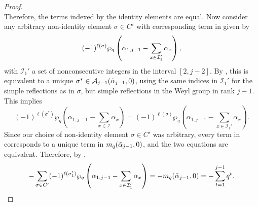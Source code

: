 \documentclass[10pt]{article}
\newcommand{\hr}[0]{\Tilde{\alpha}}
\newcommand{\qpartition}[1]{\wp_q\left(#1\right)}
\begin{document}
\begin{proof}
\begin{equation*}
    \end{equation*}
    Therefore, the terms indexed by the identity elements are equal. Now consider any arbitrary non-identity element $\sigma\in C'$ with corresponding term in  given by
    \begin{equation}
        (-1)^{\ell(\sigma)}\qpartition{\alpha_{1,j-1}-\sum_{x\in\mathcal{I}_1'}\alpha_x},\notag
    \end{equation}
    with $\mathcal{I}_1'$ a set of nonconsecutive integers in the interval $[2,j-2]$. By , this is equivalent to a unique $\sigma^*\in\mathcal{A}_{j-1}(\hr_{j-1},0)$, using the same indices in $\mathcal{I}_1'$ for the simple reflections as in $\sigma$, but simple reflections in the Weyl group in rank $j-1$. This implies 
    \begin{equation*}
        (-1)^{\ell(\sigma^*)}\qpartition{\alpha_{1,j-1}-\sum_{x\in\mathcal{I}}\alpha_x}=(-1)^{\ell(\sigma)}\qpartition{\alpha_{1,j-1}-\sum_{x\in\mathcal{I}_1'}\alpha_x}.
    \end{equation*}
    Since our choice of non-identity element $\sigma\in C'$ was arbitrary, every term in  corresponds to a unique term in $m_q(\hr_{j-1},0)$, and the two equations are equivalent. Therefore, by , 
    \begin{equation}
        -\sum_{\sigma\in C'}(-1)^{\ell(\sigma_1')}\qpartition{\alpha_{1,j-1}-\sum_{x\in\mathcal{I}_1'}\alpha_x} = -m_q(\hr_{j-1},0) = - \sum_{t=1}^{j-1} q^t.\label{DIFF OF EQS SUM 3}
    \end{equation}


\end{proof}
\end{document}
